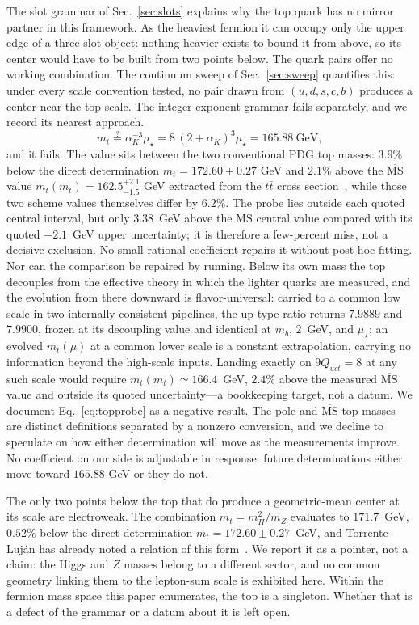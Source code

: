 \documentclass[aps,twocolumn,superscriptaddress,nofootinbib,floatfix]{revtex4-2}
\newcommand{\MSbar}{\overline{\mathrm{MS}}}
\newcommand{\mstar}{\mu_\star}
\newcommand{\alphaK}{\alpha_K}
\begin{document}
The slot grammar of Sec.~\ref{sec:slots} explains why the top quark has no mirror partner in this framework. As the heaviest fermion it can occupy only the upper edge of a three-slot object: nothing heavier exists to bound it from above, so its center would have to be built from two points below. The quark pairs offer no working combination. The continuum sweep of Sec.~\ref{sec:sweep} quantifies this: under every scale convention tested, no pair drawn from $(u,d,s,c,b)$ produces a center near the top scale. The integer-exponent grammar fails separately, and we record its nearest approach.
\begin{equation}
m_t\stackrel{?}{=}\alphaK^{-3}\mstar=8\,(2+\alphaK)^3\mstar=165.88\ \mathrm{GeV},
\label{eq:topprobe}
\end{equation}
and it fails. The value sits between the two conventional PDG top masses: $3.9\%$ below the direct determination $m_t=172.60\pm0.27$ GeV and $2.1\%$ above the $\MSbar$ value $m_t(m_t)=162.5^{+2.1}_{-1.5}$ GeV extracted from the $t\bar t$ cross section~\cite{PDG2026}, while those two scheme values themselves differ by $6.2\%$. The probe lies outside each quoted central interval, but only $3.38$~GeV above the $\MSbar$ central value compared with its quoted $+2.1$~GeV upper uncertainty; it is therefore a few-percent miss, not a decisive exclusion. No small rational coefficient repairs it without post-hoc fitting. Nor can the comparison be repaired by running. Below its own mass the top decouples from the effective theory in which the lighter quarks are measured, and the evolution from there downward is flavor-universal: carried to a common low scale in two internally consistent pipelines, the up-type ratio returns $7.9889$ and $7.9900$, frozen at its decoupling value and identical at $m_b$, $2$~GeV, and $\mstar$; an evolved $m_t(\mu)$ at a common lower scale is a constant extrapolation, carrying no information beyond the high-scale inputs. Landing exactly on $9Q_{uct}=8$ at any such scale would require $m_t(m_t)\simeq166.4$~GeV, $2.4\%$ above the measured $\MSbar$ value and outside its quoted uncertainty---a bookkeeping target, not a datum. We document Eq.~\eqref{eq:topprobe} as a negative result. The pole and $\MSbar$ top masses are distinct definitions separated by a nonzero conversion, and we decline to speculate on how either determination will move as the measurements improve. No coefficient on our side is adjustable in response: future determinations either move toward $165.88$ GeV or they do not.


The only two points below the top that do produce a geometric-mean center at its scale are electroweak. The combination $m_t=m_H^2/m_Z$ evaluates to $171.7$~GeV, $0.52\%$ below the direct determination $m_t=172.60\pm0.27$~GeV, and Torrente-Luj\'an has already noted a relation of this form~\cite{TorrenteLujan2014}. We report it as a pointer, not a claim: the Higgs and $Z$ masses belong to a different sector, and no common geometry linking them to the lepton-sum scale is exhibited here. Within the fermion mass space this paper enumerates, the top is a singleton. Whether that is a defect of the grammar or a datum about it is left open.
\end{document}
